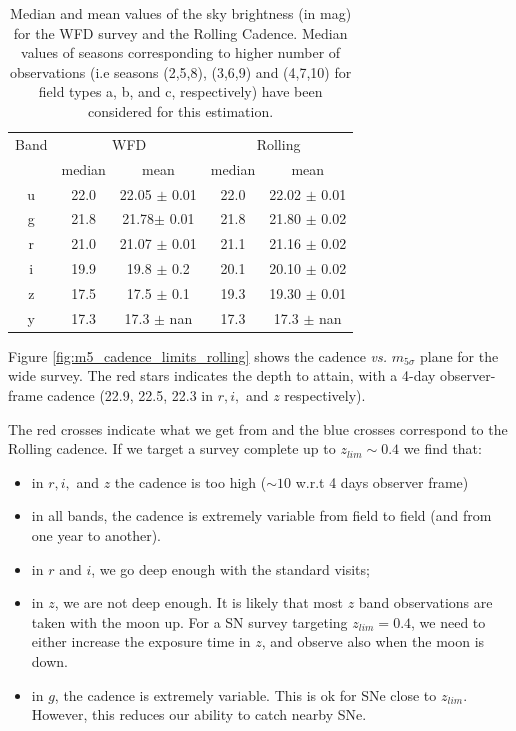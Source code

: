 \documentclass[\docopts]{\docclass}
\begin{document}
\begin{table}[t]
\begin{center}
\caption{Median and mean values of the sky brightness (in mag)  for the WFD survey and the Rolling
  Cadence. Median values of seasons corresponding to
  higher number of observations (i.e seasons (2,5,8), (3,6,9) and
  (4,7,10) for field types a, b, and c, respectively) have been
  considered for this estimation. }
\label{tab:rolling_sky}
\begin{tabular}{c|c|c|c|c}
\hline
\hline
   Band  & \multicolumn{2}{|c}{WFD}  &      \multicolumn{2}{|c}{Rolling} \\
            &     median & mean & median & mean \\
\hline
     u   &  22.0  & 22.05 $\pm$ 0.01  & 22.0  & 22.02 $\pm$ 0.01 \\
     g   &  21.8  & 21.78$\pm$ 0.01  & 21.8  & 21.80 $\pm$ 0.02  \\
     r   &   21.0  & 21.07 $\pm$ 0.01   & 21.1  & 21.16 $\pm$ 0.02  \\
     i   &   19.9  & 19.8 $\pm$ 0.2   & 20.1  & 20.10 $\pm$ 0.02 \\
     z  &   17.5  & 17.5 $\pm$ 0.1  & 19.3  & 19.30 $\pm$ 0.01 \\
    y  &    17.3  & 17.3 $\pm$ nan & 17.3   & 17.3 $\pm$ nan \\
\hline
\end{tabular}
\end{center}
\end{table}
Figure \ref{fig:m5_cadence_limits_rolling} shows the cadence {\em
  vs.}  $m_{5\sigma}$ plane for the wide survey.  The red stars
indicates the depth to attain, with a 4-day observer-frame cadence
(22.9, 22.5, 22.3 in $r, i, $ and $z$ respectively).


The red crosses indicate what we get from  and the
blue crosses correspond to the Rolling cadence. If we target a survey complete up to $z_{lim} \sim 0.4$
we find that:
\begin{itemize}
  \item in $r, i, $ and $z$ the cadence is too high ($\sim 10$ w.r.t 4 days observer frame)
  \item in all bands, the cadence is extremely variable from field to
    field (and from one year to another).
  \item in $r$ and $i$, we go deep enough with the standard visits;
  \item in $z$, we are not deep enough. It is likely that most $z$
    band observations are taken with the moon up. For a SN survey targeting 
    $z_{lim} = 0.4$, we need to either increase the exposure time in $z$, and 
    observe also when the moon is down.    
  \item in $g$, the cadence is extremely variable. This is ok for SNe
    close to $z_{lim}$.  However, this reduces our ability to catch
    nearby SNe.
\end{itemize}
\end{document}
